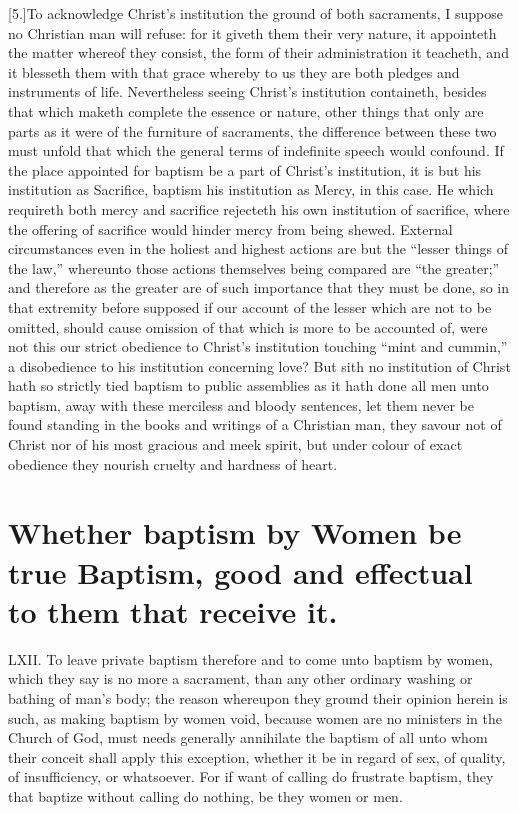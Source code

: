 [5.]To acknowledge Christ’s institution the ground of both sacraments, I suppose no Christian man will refuse: for it giveth them their very nature, it appointeth the matter whereof they consist, the form of their administration it teacheth, and it blesseth them with that grace whereby to us they are both pledges and instruments of life. Nevertheless seeing Christ’s institution containeth, besides that which maketh complete the essence or nature, other things that only are parts as it were of the furniture of sacraments, the difference between these two must unfold that which the general terms of indefinite speech would confound. If the place appointed for baptism be a part of Christ’s institution, it is but his institution as Sacrifice, baptism his institution as Mercy, in this case. He which requireth both mercy and sacrifice rejecteth his own institution of sacrifice, where the offering of sacrifice would hinder mercy from being shewed. External circumstances even in the holiest and highest actions are but the “lesser things of the law,” whereunto those actions themselves being compared are “the greater;” and therefore as the greater are of such importance that they must be done, so in that extremity before supposed if our account of the lesser which are not to be omitted, should cause omission of that which is more to be accounted of, were not this our strict obedience to Christ’s institution touching “mint and cummin,” a disobedience to his institution concerning love? But sith no institution of Christ hath so strictly tied baptism to public assemblies as it hath done all men unto baptism, away with these merciless and bloody sentences, let them never be found standing in the books and writings of a Christian man, they savour not of Christ nor of his most gracious and meek spirit, but under colour of exact obedience they nourish cruelty and hardness of heart.


\section*{Whether baptism by Women be true Baptism, good and effectual to them that receive it.}
LXII. To leave private baptism therefore and to come unto baptism by women, which they say is no more a  sacrament, than any other ordinary washing or bathing of man’s body; the reason whereupon they ground their opinion herein is such, as making baptism by women void, because women are no ministers in the Church of God, must needs generally annihilate the baptism of all unto whom their conceit shall apply this exception, whether it be in regard of sex, of quality, of insufficiency, or whatsoever.
 For if want of calling do frustrate baptism, they that baptize without calling do nothing, be they women or men.

